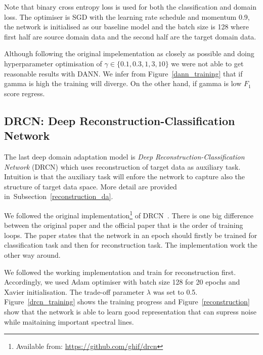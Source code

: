 Note that binary cross entropy loss is used for both the classification and domain loss.
The optimiser is SGD with the learning rate schedule and momentum 0.9,
the network is initialised as our baseline model
and the batch size is 128 where first half are source domain data
and the second half are the target domain data.

Although following the original impelementation as closely as possible
and doing hyperparameter optimisation of \(\gamma \in \{0.1, 0.3, 1, 3, 10\}\)
we were not able to get reasonable results with DANN.
We infer from Figure~\ref{dann_training} that
if gamma is high the training will diverge.
On the other hand, if gamma is low \(F_1\) score regress.

\subsection{DRCN: Deep Reconstruction-Classification Network}

The last deep domain adaptation model is
\textit{Deep Reconstruction-Classification Network} (DRCN)
which uses reconstruction of target data as auxiliary task.
Intuition is that the auxiliary task
will enfore the network to capture also the structure of target data space.
More detail are provided in~Subsection~\ref{reconstruction_da}.

We followed the original implementation\footnote{Available from: \url{https://github.com/ghif/drcn}} of DRCN~\cite{ghifary2016}.
There is one big difference between the original paper and the official paper
that is the order of training loops.
The paper states that the network in an epoch
should firstly be trained for classification task
and then for reconstruction task.
The implementation work the other way around.

We followed the working implementation and train for reconstruction first.
Accordingly, we used Adam optimiser with batch size 128 for 20 epochs
and Xavier initialisation.
The trade-off parameter \(\lambda\) was set to 0.5.
Figure~\ref{drcn_training} shows the training progress
and Figure~\ref{reconstruction} show that the network is able to learn
good representation that can supress noise
while maitaining important spectral lines.

